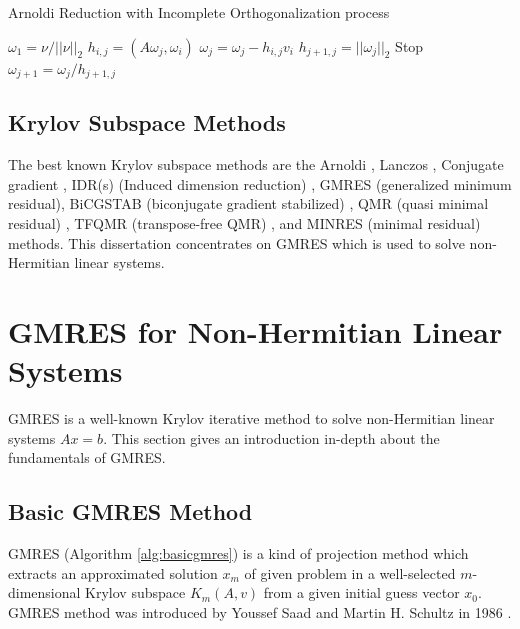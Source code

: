 \begin{algorithm}[t]{}
	\caption{Arnoldi Reduction with Incomplete Orthogonalization process}   
	\label{alg:arnoldi-incomplete-reduction}   
	\begin{algorithmic}[1]
		\State $\omega_1=\nu /||\nu||_2$
		\State $h_{i,j}=(A\omega_j,\omega_i)$
		\State $\omega_j=\omega_j-h_{i,j}v_i$
		\EndFor
		\State $h_{j+1,j}=||\omega_j||_2$
		 Stop
		\EndIf
		\State $\omega_{j+1}=\omega_j/h_{j+1,j}$
		\EndFor 
		\EndFunction
	\end{algorithmic}  
\end{algorithm}

\subsection{Krylov Subspace Methods}

The best known Krylov subspace methods are the Arnoldi \cite{voss2004arnoldi}, Lanczos \cite{widlund1978lanczos}, Conjugate gradient \cite{lasdon1967conjugate}, IDR(s) (Induced dimension reduction) \cite{van2015induced}, GMRES (generalized minimum residual), BiCGSTAB (biconjugate gradient stabilized) \cite{sleijpen1993bicgstab}, QMR (quasi minimal residual) \cite{freund1991qmr}, TFQMR (transpose-free QMR) \cite{basermann1996qmr}, and MINRES (minimal residual) \cite{paige1975solution} methods. This dissertation concentrates on GMRES which is used to solve non-Hermitian linear systems.

\section{GMRES for Non-Hermitian Linear Systems}

GMRES is a well-known Krylov iterative method to solve non-Hermitian linear systems $Ax=b$. This section gives an introduction in-depth about the fundamentals of GMRES.

\subsection{Basic GMRES Method}

GMRES (Algorithm \ref{alg:basicgmres}) is a kind of projection method which extracts an approximated solution $x_m$ of given problem in a well-selected $m$-dimensional Krylov subspace \(K_m(A,v)\) from a given initial guess vector $x_0$.  GMRES method was introduced by Youssef Saad and Martin H. Schultz in 1986 \cite{saad1986gmres}.


